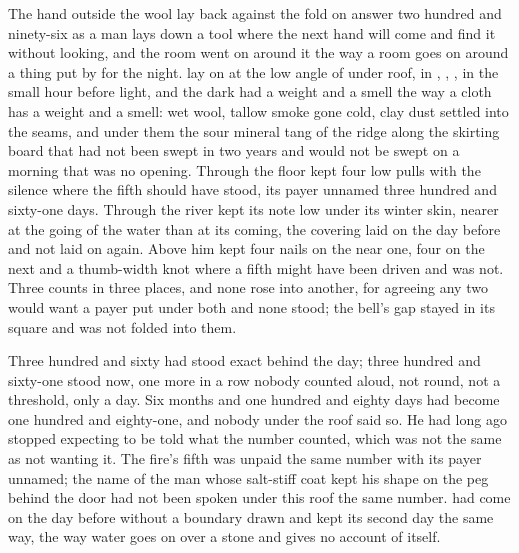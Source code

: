 
The hand outside the wool lay back against the fold on answer two hundred and ninety-six as a man lays down a tool where the next hand will come and find it without looking, and the room went on around it the way a room goes on around a thing put by for the night.  lay on  at the low angle of  under  roof, in , , , in the small hour before light, and the dark had a weight and a smell the way a cloth has a weight and a smell: wet wool, tallow smoke gone cold, clay dust settled into the seams, and under them the sour mineral tang of the ridge along the skirting board that had not been swept in two years and would not be swept on a morning that was no opening. Through the floor  kept four low pulls with the silence where the fifth should have stood, its payer unnamed three hundred and sixty-one days. Through  the river kept its note low under its winter skin, nearer at the going of the water than at its coming, the covering laid on the day before and not laid on again. Above him  kept four nails on the near one, four on the next and a thumb-width knot where a fifth might have been driven and was not. Three counts in three places, and none rose into another, for agreeing any two would want a payer put under both and none stood; the bell's gap stayed in its square and was not folded into them.

Three hundred and sixty had stood exact behind the day; three hundred and sixty-one stood now, one more in a row nobody counted aloud, not round, not a threshold, only a day. Six months and one hundred and eighty days had become one hundred and eighty-one, and nobody under the roof said so. He had long ago stopped expecting to be told what the number counted, which was not the same as not wanting it. The fire's fifth was unpaid the same number with its payer unnamed; the name of the man whose salt-stiff coat kept his shape on the peg behind the door had not been spoken under this roof the same number.  had come on the day before without a boundary drawn and kept its second day the same way, the way water goes on over a stone and gives no account of itself.

